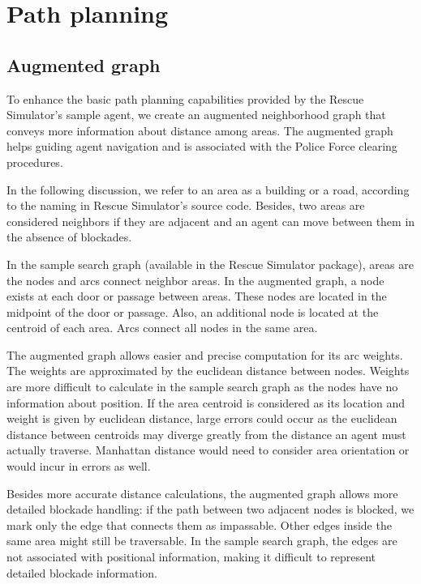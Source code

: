 \section{Path planning}
\label{sec:path}

\subsection{Augmented graph}
\label{sec:augraph}
To enhance the basic path planning capabilities provided by the Rescue Simulator's sample agent, we create an augmented neighborhood graph that conveys more information about distance among areas. The augmented graph helps guiding agent navigation and is associated with the Police Force clearing procedures.

In the following discussion, we refer to an area as a building or a road, according to the naming in Rescue Simulator's source code. Besides, two areas are considered neighbors if they are adjacent and an agent can move between them in the absence of blockades.

In the sample search graph (available in the Rescue Simulator package), areas are the nodes and arcs connect neighbor areas. In the augmented graph, a node exists at each door or passage between areas. These nodes are located in the midpoint of the door or passage. Also, an additional node is located at the centroid of each area. Arcs connect all nodes in the same area. 

The augmented graph allows easier and precise computation for its arc weights. The weights are approximated by the euclidean distance between nodes. Weights are more difficult to calculate in the sample search graph as the nodes have no information about position. 
If the area centroid is considered as its location and weight is given by euclidean distance, large errors could occur as the euclidean distance between centroids may diverge greatly from the distance an agent must actually traverse. Manhattan distance would need to consider area orientation or would incur in errors as well. 

Besides more accurate distance calculations, the augmented graph allows more detailed blockade handling: if the path between two adjacent nodes is blocked, we mark only the edge that connects them as impassable. Other edges inside the same area might still be traversable. In the sample search graph, the edges are not associated with positional information, making it difficult to represent detailed blockade information.

